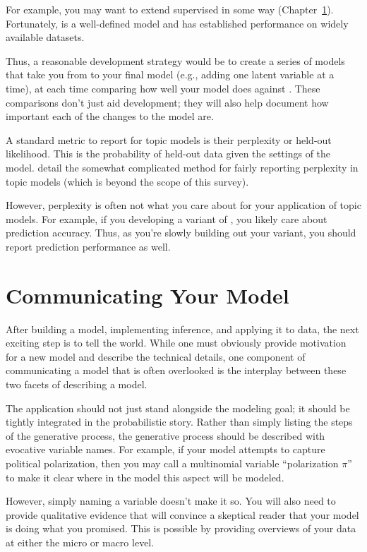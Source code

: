 For example, you may want to extend supervised  in some way
(Chapter~\ref{}).  Fortunately,  is a well-defined model and
has established performance on widely available datasets.

Thus, a reasonable development strategy would be to create a series of
models that take you from  to your final model (e.g., adding
one latent variable at a time), at each time comparing how well your
model does against .  These comparisons don't just aid
development; they will also help document how important each of the
changes to the model are.

A standard metric to report for topic models is their perplexity or
held-out likelihood.  This is the probability of held-out data given
the settings of the model.  \citet{} detail the somewhat complicated
method for fairly reporting perplexity in topic models (which is
beyond the scope of this survey).

However, perplexity is often not what you care about for your
application of topic models.  For example, if you developing a variant
of , you likely care about prediction accuracy.  Thus, as
you're slowly building out your  variant, you should report
prediction performance as well.

\section{Communicating Your Model}

After building a model, implementing inference, and applying it to
data, the next exciting step is to tell the world.  While one must
obviously provide motivation for a new model and describe the
technical details, one component of communicating a model that is
often overlooked is the interplay between these two facets of
describing a model.

The application should not just stand alongside the modeling goal; it
should be tightly integrated in the probabilistic story.  Rather than
simply listing the steps of the generative process, the generative
process should be described with evocative variable names.  For
example, if your model attempts to capture political polarization,
then you may call a multinomial variable ``polarization $\pi$'' to
make it clear where in the model this aspect will be modeled.

However, simply naming a variable doesn't make it so.  You will also
need to provide qualitative evidence that will convince a skeptical
reader that your model is doing what you promised.  This is possible
by providing overviews of your data at either the micro or macro
level.

